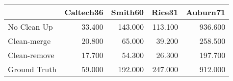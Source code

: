 \begin{tabular}{lrrrr}
\toprule
{} & Caltech36 & Smith60 &  Rice31 & Auburn71 \\
\midrule
No Clean Up  &    33.400 & 143.000 & 113.100 &  936.600 \\
Clean-merge  &    20.800 &  65.000 &  39.200 &  258.500 \\
Clean-remove &    17.700 &  54.300 &  26.300 &  197.700 \\
Ground Truth &    59.000 & 192.000 & 247.000 &  912.000 \\
\bottomrule
\end{tabular}

